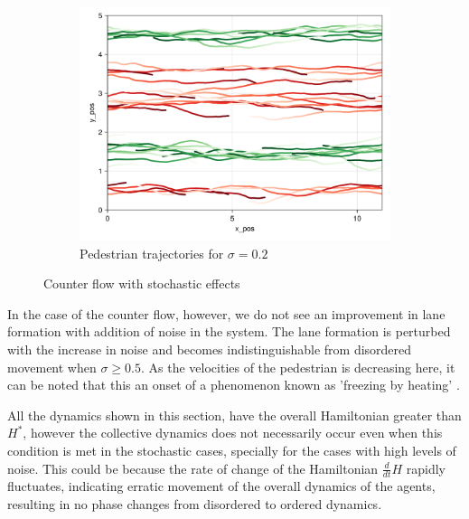 \begin{itemize}
\begin{figure}[H]
\begin{subfigure}{.49\textwidth}
            \includegraphics[width=\linewidth]{figures/s0.2_counterflow_10000.png}
            \caption{Pedestrian trajectories for $\sigma = 0.2$}
            \label{plot:stoc_counter_traj}
        \end{subfigure}
        \caption{Counter flow with stochastic effects}
        \label{plot:stoc_counter}
    \end{figure}
    In the case of the counter flow, however, we do not see an improvement in lane formation with addition of noise in the system. The lane formation is perturbed with the increase in noise and becomes indistinguishable from disordered movement when $\sigma \geq 0.5$. As the velocities of the pedestrian is decreasing here, it can be noted that this an onset of a phenomenon known as 'freezing by heating' \cite{helbing2000freezing}.
\end{itemize}

All the dynamics shown in this section, have the overall Hamiltonian greater than $H^*$, however the collective dynamics does not necessarily occur even when this condition is met in the stochastic cases, specially for the cases with high levels of noise. This could be because the rate of change of the Hamiltonian $\frac{d}{dt}H$ rapidly fluctuates, indicating erratic movement of the overall dynamics of the agents, resulting in no phase changes from disordered to ordered dynamics.


